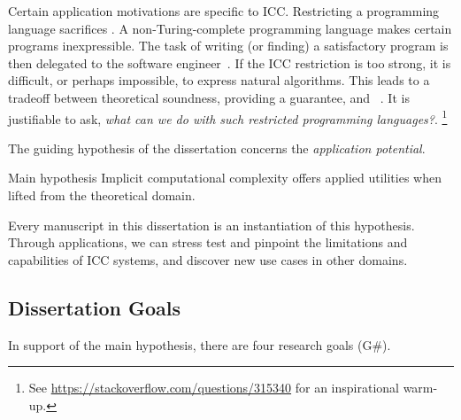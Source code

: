 Certain application motivations are specific to ICC\@.
Restricting a programming language sacrifices .
A non-Turing-complete programming language makes certain programs inexpressible.
The task of writing (or finding) a satisfactory program is then delegated to the software engineer~\cite[p. 14]{moyen2017}.
If the ICC restriction is too strong, it is difficult, or perhaps impossible, to express natural algorithms.
This leads to a tradeoff between theoretical soundness, \ie providing a guarantee, and ~\cite{feree2018}.
It is justifiable to ask, \emph{what can we do with such restricted programming languages?}.%
\footnote{See \url{https://stackoverflow.com/questions/315340} for an inspirational warm-up.}

The guiding hypothesis of the dissertation concerns the \emph{application potential}.
\begin{infobox}[]{Main hypothesis}
Implicit computational complexity offers applied utilities when lifted from the
theoretical domain.
\end{infobox}

\noindent
Every manuscript in this dissertation is an instantiation of this hypothesis.
Through applications, we can stress test and pinpoint the limitations and capabilities of ICC systems, and discover new use cases in other domains.


\subsection{Dissertation Goals}\label{subsec:specific-aims}

In support of the main hypothesis, there are four research goals (G\#).

